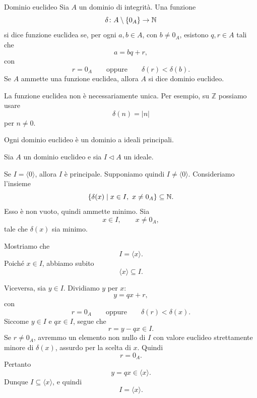 \documentclass[a4paper]{article}
\begin{document}
\begin{radioactive}
\begin{snippetdefinition}{Dominio euclideo}
    Sia \(A\) un dominio di integrità. Una funzione
    \[
        \delta\colon A\setminus\{0_A\}\to \mathbb{N}
    \]
    si dice funzione euclidea se, per ogni \(a,b\in A\), con \(b\neq 0_A\), esistono \(q,r\in A\) tali che
    \[
        a=bq+r,
    \]
    con
    \[
        r=0_A
        \qquad
        \text{oppure}
        \qquad
        \delta(r)<\delta(b).
    \]
    Se \(A\) ammette una funzione euclidea, allora \(A\) si dice dominio euclideo.
\end{snippetdefinition}
\end{radioactive}

\begin{radioactive}
\begin{snippetremark}{}
    La funzione euclidea non è necessariamente unica. Per esempio, su \(\mathbb{Z}\) possiamo usare
    \[
        \delta(n)=|n|
    \]
    per \(n\neq 0\).
\end{snippetremark}
\end{radioactive}

\begin{radioactive}
\begin{snippetproposition}{}
    Ogni dominio euclideo è un dominio a ideali principali.
\end{snippetproposition}
\end{radioactive}

\begin{radioactive}
\begin{snippetproof}{}
    Sia \(A\) un dominio euclideo e sia \(I\triangleleft A\) un ideale.

    Se \(I=\langle 0 \rangle\), allora \(I\) è principale. Supponiamo quindi \(I\neq \langle 0 \rangle\).
    Consideriamo l'insieme
    \[
        \{\delta(x)\mid x\in I,\ x\neq 0_A\}\subseteq \mathbb{N}.
    \]
    Esso è non vuoto, quindi ammette minimo. Sia
    \[
        x\in I,\qquad x\neq 0_A,
    \]
    tale che \(\delta(x)\) sia minimo.

    Mostriamo che
    \[
        I=\langle x \rangle.
    \]
    Poiché \(x\in I\), abbiamo subito
    \[
        \langle x \rangle\subseteq I.
    \]

    Viceversa, sia \(y\in I\). Dividiamo \(y\) per \(x\):
    \[
        y=qx+r,
    \]
    con
    \[
        r=0_A
        \qquad
        \text{oppure}
        \qquad
        \delta(r)<\delta(x).
    \]
    Siccome \(y\in I\) e \(qx\in I\), segue che
    \[
        r=y-qx\in I.
    \]
    Se \(r\neq 0_A\), avremmo un elemento non nullo di \(I\) con valore euclideo strettamente minore di \(\delta(x)\), assurdo per la scelta di \(x\).
    Quindi
    \[
        r=0_A.
    \]
    Pertanto
    \[
        y=qx\in \langle x \rangle.
    \]
    Dunque \(I\subseteq \langle x \rangle\), e quindi
    \[
        I=\langle x \rangle.
    \]
\end{snippetproof}
\end{radioactive}
\end{document}
